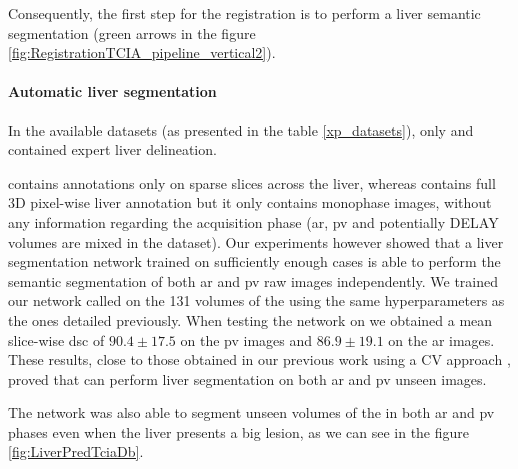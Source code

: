 Consequently, the first step for the \textbf{} registration is to perform a
liver semantic segmentation (green arrows in the figure \ref{fig:RegistrationTCIA_pipeline_vertical2}).

\paragraph{Automatic liver segmentation}\label{tcia-db-unsupervised-liver-segmentation}

In the available datasets (as presented in the table \ref{xp_datasets}), only \textbf{} and
 contained expert liver delineation.

 contains annotations only on sparse slices across the liver,
whereas \textbf{} contains full 3D pixel-wise liver annotation but it only
contains monophase images, without any information regarding the
acquisition phase (\ac{ar}, \ac{pv} and potentially DELAY volumes are mixed in the dataset).
Our experiments however showed that a liver segmentation network trained
on sufficiently enough cases is able to perform the semantic
segmentation of both \ac{ar} and \ac{pv} raw images independently.
We trained our network called  on the 131 volumes of the
 using the same hyperparameters as the ones detailed
previously. When testing the  network on \textbf{} we
obtained a mean slice-wise \ac{dsc} of $ 90.4 \pm 17.5 $ on the \ac{pv} images and
$ 86.9 \pm 19.1 $ on the \ac{ar} images. These results, close to those obtained
in our previous work using a CV approach \cite{Ouhmich2019}, proved that  can
perform liver segmentation on both \ac{ar} and \ac{pv} unseen images.

The  network was also able to segment unseen volumes of the
\textbf{} in both \ac{ar} and \ac{pv} phases even when the liver presents a big
lesion, as we can see in the figure \ref{fig:LiverPredTciaDb}.

